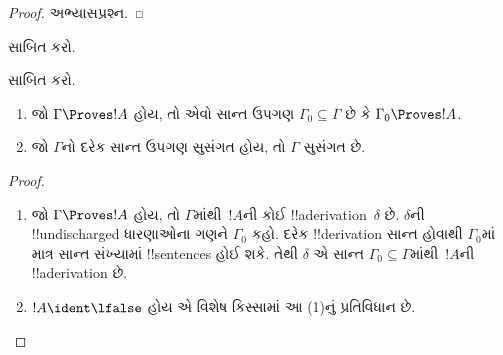\documentclass[../../../include/open-logic-section]{subfiles}
\begin{document}
\begin{proof}
અભ્યાસપ્રશ્ન.
\end{proof}

\begin{prob}
 સાબિત કરો.
\end{prob}
\tagendprob

\begin{prob}
 સાબિત કરો.
\end{prob}
\tagendprob

\begin{prop}[સઘનતા]
  \begin{enumerate}
  \item જો $\Gamma \Proves !A$ હોય, તો એવો સાન્ત ઉપગણ
    $\Gamma_0 \subseteq \Gamma$ છે કે $\Gamma_0 \Proves !A$.
  \item જો $\Gamma$નો દરેક સાન્ત ઉપગણ સુસંગત હોય, તો $\Gamma$ સુસંગત છે.
  \end{enumerate}
\end{prop}

\begin{proof}
  \begin{enumerate}
    \item જો $\Gamma \Proves !A$ હોય, તો $\Gamma$માંથી~$!A$ની કોઈ
      !!a{derivation}~$\delta$ છે. $\delta$ની !!{undischarged}
      ધારણાઓના ગણને $\Gamma_0$ કહો. દરેક !!{derivation} સાન્ત હોવાથી
      $\Gamma_0$માં માત્ર સાન્ત સંખ્યામાં !!{sentence}s હોઈ શકે. તેથી
      $\delta$ એ સાન્ત $\Gamma_0 \subseteq \Gamma$માંથી~$!A$ની
      !!a{derivation} છે.
    \item $!A \ident \lfalse$ હોય એ વિશેષ કિસ્સામાં આ (1)નું
      પ્રતિવિધાન છે.
  \end{enumerate}
\end{proof}
\end{document}
